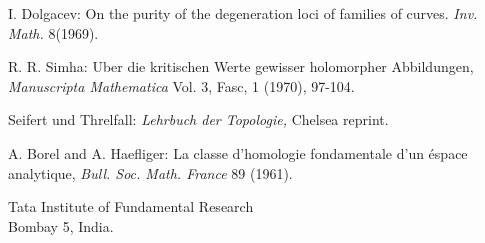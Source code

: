 \begin{thebibliography}{99}
 I. Dolgacev: On the purity of the degeneration loci of families of curves. {\em Inv. Math.} 8(1969).

 R. R. Simha: Uber die kritischen Werte gewisser holomorpher Abbildungen, {\em Manuscripta Mathematica} Vol. 3, Fasc, 1 (1970), 97-104.

 Seifert und Threlfall: {\em Lehrbuch der Topologie,} Chelsea reprint.

 A. Borel and A. Haefliger: La classe d'homologie fondamentale d'un \'espace analytique, {\em Bull. Soc. Math. France } 89 (1961).
\end{thebibliography}

\noindent
Tata Institute of Fundamental Research\\
Bombay 5, India.

\vfill\eject
~\phantom{a}
\thispagestyle{empty}
